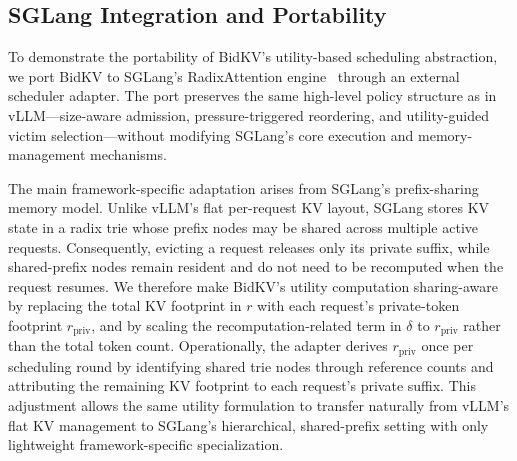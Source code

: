 \documentclass[sigconf,nonacm]{acmart}
\newcommand{\bidkv}{BidKV\xspace}
\newcommand{\tokfree}{\ensuremath{r}}
\newcommand{\qualdelta}{\ensuremath{\delta}}
\begin{document}

\subsection{SGLang Integration and Portability}\label{sec:impl:sglang}

To demonstrate the portability of \bidkv's utility-based scheduling abstraction, we port \bidkv to SGLang's RadixAttention engine~\cite{Zheng2024sglang} through an external scheduler adapter. The port preserves the same high-level policy structure as in vLLM---size-aware admission, pressure-triggered reordering, and utility-guided victim selection---without modifying SGLang's core execution and memory-management mechanisms.

The main framework-specific adaptation arises from SGLang's prefix-sharing memory model. Unlike vLLM's flat per-request KV layout, SGLang stores KV state in a radix trie whose prefix nodes may be shared across multiple active requests. Consequently, evicting a request releases only its private suffix, while shared-prefix nodes remain resident and do not need to be recomputed when the request resumes. We therefore make \bidkv's utility computation sharing-aware by replacing the total KV footprint in $\tokfree$ with each request's private-token footprint $r_{\mathrm{priv}}$, and by scaling the recomputation-related term in $\qualdelta$ to $r_{\mathrm{priv}}$ rather than the total token count. Operationally, the adapter derives $r_{\mathrm{priv}}$ once per scheduling round by identifying shared trie nodes through reference counts and attributing the remaining KV footprint to each request's private suffix. This adjustment allows the same utility formulation to transfer naturally from vLLM's flat KV management to SGLang's hierarchical, shared-prefix setting with only lightweight framework-specific specialization.
\end{document}
